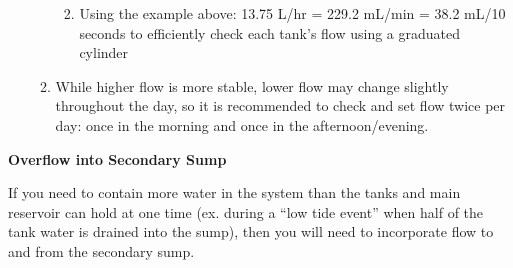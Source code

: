 \documentclass[
]{book}
\providecommand{\tightlist}{%
  \setlength{\itemsep}{0pt}\setlength{\parskip}{0pt}}
\begin{document}
\begin{enumerate}
\begin{enumerate}
    \begin{enumerate}
    \def\labelenumiii{\arabic{enumiii}.}
    \tightlist
    \item
      Using the example above: 13.75 L/hr = 229.2 mL/min = 38.2 mL/10 seconds to efficiently check each tank's flow using a graduated cylinder
    \end{enumerate}
  \item
    While higher flow is more stable, lower flow may change slightly throughout the day, so it is recommended to check and set flow twice per day: once in the morning and once in the afternoon/evening.
  \end{enumerate}
\end{enumerate}

\textbf{Overflow into Secondary Sump}

If you need to contain more water in the system than the tanks and main reservoir can hold at one time (ex. during a ``low tide event'' when half of the tank water is drained into the sump), then you will need to incorporate flow to and from the secondary sump.
\end{document}
